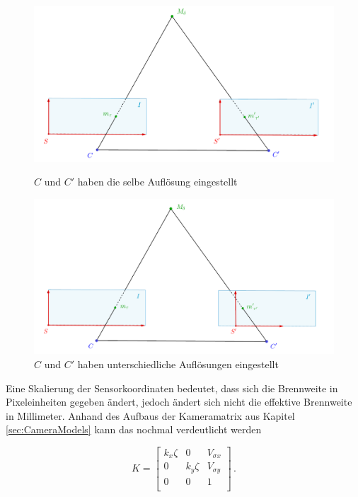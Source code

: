 \begin{figure}[!htb]
	\includegraphics[width=\linewidth]{images/SensorSelbeAufloesung_beschriftet.png}
	\caption[Sensorkoordinatensysteme bei Kameras gleicher Auflösung]{$C$ und $C'$ haben die selbe Auflösung eingestellt}
	\label{fig:Aufl1}
	\endminipage\hfill
	\includegraphics[width=\linewidth]{images/SensorUnterschiedlicheAufloesung_beschriftet.png}
	\caption[Sensorkoordinatensysteme bei Kameras unterschiedlicher Auflösung]{$C$ und $C'$ haben unterschiedliche Auflösungen eingestellt}
	\label{fig:Aufl2}
	\endminipage\hfill
\end{figure}


Eine Skalierung der Sensorkoordinaten bedeutet, dass sich die Brennweite in Pixeleinheiten gegeben ändert, jedoch ändert sich nicht die effektive Brennweite in Millimeter. Anhand des Aufbaus der Kameramatrix aus Kapitel \ref{sec:CameraModels} kann das nochmal verdeutlicht werden

\begin{equation}
K=  \begin{bmatrix}
k_x \zeta & 0 & V_{\sigma x}\\
0 & k_y \zeta & V_{\sigma y}\\
0 & 0   & 1 \\
\end{bmatrix} \, .
\end{equation}

